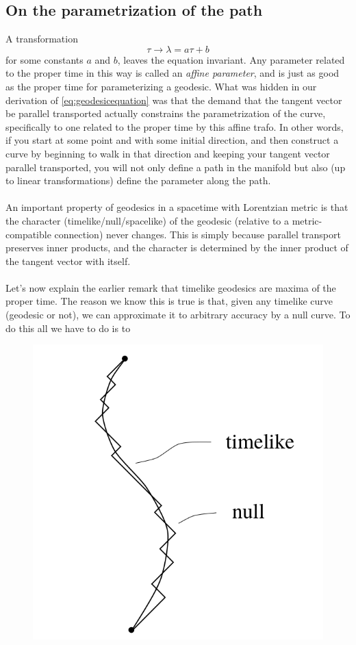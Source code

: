 \subsection{On the parametrization of the path}
A transformation
\begin{equation}
	\tau \rightarrow\lambda = a \tau +b
\end{equation}
for some constants $a$ and $b$, leaves the equation invariant. Any parameter related to the
proper time in this way is called an \emph{affine parameter}, and is just as good as the proper
time for parameterizing a geodesic. What was hidden in our derivation of  \ref{eq:geodesicequation} was that
the demand that the tangent vector be parallel transported actually constrains the parametrization of the curve, specifically to one related to the proper time by this affine trafo. In other words,
if you start at some point and with some initial direction, and then construct a curve by
beginning to walk in that direction and keeping your tangent vector parallel transported,
you will not only define a path in the manifold but also (up to linear transformations) define
the parameter along the path.\\
\\
An important property of geodesics in a spacetime with Lorentzian metric is that the
character (timelike/null/spacelike) of the geodesic (relative to a metric-compatible connection) never changes. This is simply because parallel transport preserves inner products, and
the character is determined by the inner product of the tangent vector with itself.
\\
\\
Let’s now explain the earlier remark that timelike geodesics are maxima of the proper
time. The reason we know this is true is that, given any timelike curve (geodesic or not), we
can approximate it to arbitrary accuracy by a null curve. To do this all we have to do is to
\begin{figure}[h!]
	\centering
	\includegraphics[width=0.7\linewidth]{gfx/ApproximateTimelikeByNullGeodesic}
	\caption{}
	\label{fig:approximatetimelikebynullgeodesic}
\end{figure}

